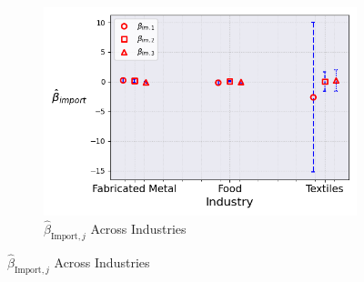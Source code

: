 \documentclass{article}
\begin{document}
\begin{figure}[ht!]
\begin{subfigure}[t]{0.32\textwidth}
        \includegraphics[width=\textwidth]{figure/stationary_normal_kmshare_ciiu_beta_im_across_industries_m3.png}
        \caption{$\hat{\beta}_{\text{Import},j}$ Across Industries}
    \end{subfigure}
\end{figure}
\end{document}
